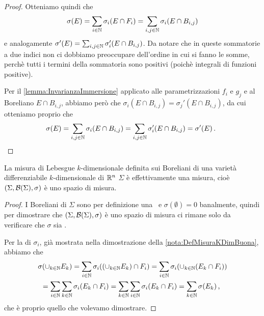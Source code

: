 \begin{proof}
	Otteniamo quindi che
	\begin{equation*}
		\sigma(E)=\sum_{i\in\mathbb N}\sigma_i(E \cap F_i)=\sum_{i,j\in\mathbb N} \sigma_i(E\cap B_{i,j})
	\end{equation*}
	e analogamente $\sigma'(E)=\sum_{i,j\in\mathbb N} \sigma_i'(E\cap B_{i,j})$. Da notare che in queste sommatorie a due indici non ci dobbiamo preoccupare dell'ordine in cui si fanno le somme, perchè tutti i termini della sommatoria sono positivi (poichè integrali di funzioni positive).

	Per il \cref{lemma:InvarianzaImmersione} applicato alle parametrizzazioni $f_i$ e $g_j$ e al Boreliano $E\cap B_{i,j}$, abbiamo però che $\sigma_i(E\cap B_{i,j})=\sigma_j'(E\cap B_{i,j})$, da cui otteniamo proprio che 
	\begin{equation*}
		\sigma(E)=\sum_{i,j\in\mathbb N} \sigma_i(E\cap B_{i,j})=\sum_{i,j\in\mathbb N} \sigma_i'(E\cap B_{i,j})=\sigma'(E)\, \text{. }
	\end{equation*}

\end{proof}

\begin{theorem}
	La misura di Lebesgue $k$-dimensionale definita sui Boreliani di una varietà differenziabile $k$-dimensionale di $\mathbb R^n$ $\Sigma$ è effettivamente una misura, cioè $(\Sigma,\mathcal B(\Sigma),\sigma)$ è uno spazio di misura.
\end{theorem}
\begin{proof}
	I Boreliani di $\Sigma$ sono per definizione una \sigalg\ e $\sigma(\emptyset)=0$ banalmente, quindi per dimostrare che $(\Sigma,\mathcal B(\Sigma),\sigma)$ è uno spazio di misura ci rimane solo da verificare che $\sigma$ sia \sigadd.
	
	Per la \sigadd[ità] di $\sigma_i$, già mostrata nella dimostrazione della \cref{nota:DefMisuraKDimBuona}, abbiamo che
	\begin{multline*}
		\sigma(\cup_{k\in\mathbb N}E_k)=\sum_{i\in\mathbb N}\sigma_i((\cup_{k\in\mathbb N}E_k)\cap F_i)=\sum_{i\in\mathbb N}\sigma_i(\cup_{k\in\mathbb N}(E_k\cap F_i))\\
		=\sum_{i\in\mathbb N}\sum_{k\in\mathbb N}\sigma_i(E_k\cap F_i)=\sum_{k\in\mathbb N}\sum_{i\in\mathbb N}\sigma_i(E_k\cap F_i)=\sum_{k\in\mathbb N}\sigma(E_k)\, \text{, }
	\end{multline*}
	che è proprio quello che volevamo dimostrare.
\end{proof}
